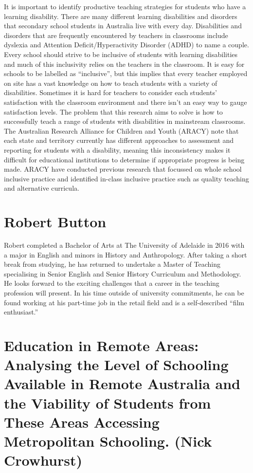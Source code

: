 \documentclass[twoside,12pt,a4paper,notitlepage]{memoir}
\begin{document}
It is important to identify productive teaching strategies for students who have a learning disability. There are many different learning disabilities and disorders that secondary school students in Australia live with every day. Disabilities and disorders that are frequently encountered by teachers in classrooms include dyslexia and Attention Deficit/Hyperactivity Disorder (ADHD) to name a couple. Every school should strive to be inclusive of students with learning disabilities and much of this inclusivity relies on the teachers in the classroom. It is easy for schools to be labelled as “inclusive”, but this implies that every teacher employed on site has a vast knowledge on how to teach students with a variety of disabilities. Sometimes it is hard for teachers to consider each students’ satisfaction with the classroom environment and there isn’t an easy way to gauge satisfaction levels. The problem that this research aims to solve is how to successfully teach a range of students with disabilities in mainstream classrooms. The Australian Research Alliance for Children and Youth (ARACY) note that each state and territory currently has different approaches to assessment and reporting for students with a disability, meaning this inconsistency makes it difficult for educational institutions to determine if appropriate progress is being made. ARACY have conducted previous research that focussed on whole school inclusive practice and identified in-class inclusive practice such as quality teaching and alternative curricula.

\section*{Robert Button}

Robert completed a Bachelor of Arts at The University of Adelaide in 2016 with a major in English and minors in History and Anthropology. After taking a short break from studying, he has returned to undertake a Master of Teaching specialising in Senior English and Senior History Curriculum and Methodology. He looks forward to the exciting challenges that a career in the teaching profession will present.
In his time outside of university commitments, he can be found working at his part-time job in the retail field and is a self-described “film enthusiast.”



\pagebreak
\section*{Education in Remote Areas: Analysing the Level of Schooling Available in Remote Australia and the Viability of Students from These Areas Accessing Metropolitan Schooling. (Nick Crowhurst)}
\label{aut:crowhurst}
\end{document}
